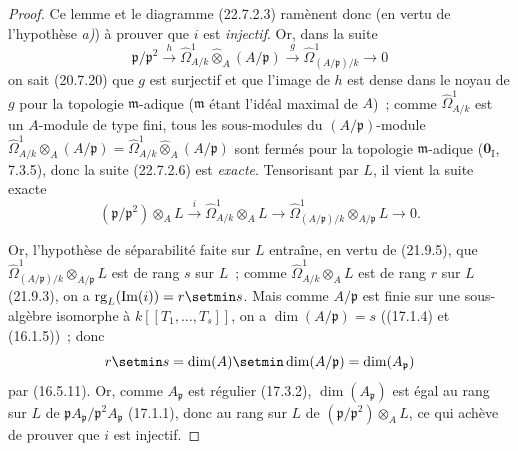 \begin{proof}
Ce lemme et le diagramme (22.7.2.3) ramènent donc (en vertu de l'hypothèse \emph{a)})
à prouver que $i$ est \emph{injectif}. Or, dans la suite
\begin{equation}
\label{0.22.7.2.6-fr}
  \mathfrak p/\mathfrak p^2\xrightarrow{h}
  \widehat\Omega^1_{A/k}\widehat\otimes_A(A/\mathfrak p)
  \xrightarrow{g}\widehat\Omega^1_{(A/\mathfrak p)/k}\longrightarrow0
  \tag{22.7.2.6}
\end{equation}
on sait (20.7.20) que $g$ est surjectif et que l'image de $h$ est dense dans
le noyau de $g$ pour la topologie $\mathfrak m$-adique ($\mathfrak m$ étant
l'idéal maximal de $A$)~; comme $\widehat\Omega^1_{A/k}$ est un $A$-module de
type fini, tous les sous-modules du $(A/\mathfrak p)$-module
$\widehat\Omega^1_{A/k}\otimes_A(A/\mathfrak p)
=\widehat\Omega^1_{A/k}\widehat\otimes_A(A/\mathfrak p)$
sont fermés pour la topologie $\mathfrak m$-adique ($\mathbf{0}_{\mathrm I}$, 7.3.5),
donc la suite (22.7.2.6) est \emph{exacte}. Tensorisant par $L$, il vient la suite
exacte
\[
  (\mathfrak p/\mathfrak p^2)\otimes_AL\xrightarrow{i}
  \widehat\Omega^1_{A/k}\otimes_AL\longrightarrow
  \widehat\Omega^1_{(A/\mathfrak p)/k}\otimes_{A/\mathfrak p}L
  \longrightarrow0.
\]

Or, l'hypothèse de séparabilité faite sur $L$ entraîne, en vertu de (21.9.5),
que $\widehat\Omega^1_{(A/\mathfrak p)/k}\otimes_{A/\mathfrak p}L$ est de
rang $s$ sur $L$~; comme $\widehat\Omega^1_{A/k}\otimes_AL$ est de rang $r$
sur $L$ (21.9.3), on a $\operatorname{rg}_L(\operatorname{Im}(i))=r\setmin s$. Mais comme
$A/\mathfrak p$ est finie sur une sous-algèbre isomorphe à
$k[[T_1,\ldots,T_s]]$, on a $\dim(A/\mathfrak p)=s$ ((17.1.4) et (16.1.5))~;
donc
\[
  r\setmin s=\dim(A)\setmin\dim(A/\mathfrak p)=\dim(A_{\mathfrak p})
\]
par (16.5.11). Or, comme $A_{\mathfrak p}$ est régulier (17.3.2),
$\dim(A_{\mathfrak p})$ est égal au rang sur $L$ de
$\mathfrak pA_{\mathfrak p}/\mathfrak p^2A_{\mathfrak p}$ (17.1.1), donc au
rang sur $L$ de $(\mathfrak p/\mathfrak p^2)\otimes_AL$, ce qui achève de
prouver que $i$ est injectif.
\end{proof}

